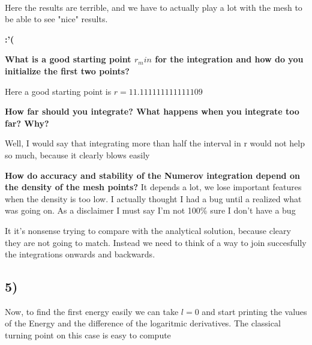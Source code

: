 \documentclass[10pt]{article}
\begin{document}
    \begin{center}
    \end{center}
    { \hspace*{\fill} \\}

    Here the results are terrible, and we have to actually play a lot with
the mesh to be able to see "nice" results.

\textbf{:'(}

\textbf{What is a good starting point \(r_min\) for the integration and
how do you initialize the first two points? }

Here a good starting point is \(r = 11.111111111111109\)

\textbf{How far should you integrate? What happens when you integrate
too far? Why? }

Well, I would say that integrating more than half the interval in r
would not help so much, because it clearly blows easily

\textbf{How do accuracy and stability of the Numerov integration depend
on the density of the mesh points?} It depends a lot, we lose important
features when the density is too low. I actually thought I had a bug
until a realized what was going on. As a disclaimer I must say I'm not
100\% sure I don't have a bug

It it's nonsense trying to compare with the analytical solution, because
cleary they are not going to match. Instead we need to think of a way to
join succesfully the integrations onwards and backwards.

\subsection{5)}\label{section}

Now, to find the first energy easily we can take \(l = 0\) and start
printing the values of the Energy and the difference of the logaritmic
derivatives. The classical turning point on this case is easy to compute
\end{document}
